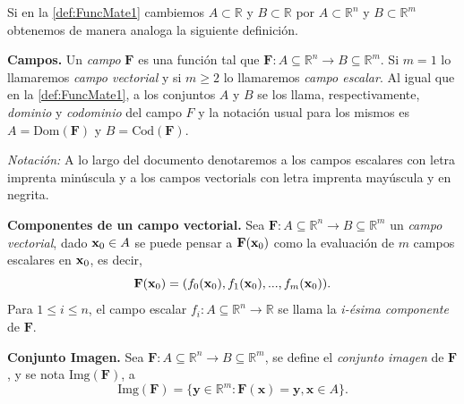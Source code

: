 
\begin{obs}
Si en la \autoref{def:FuncMate1} cambiemos  $A \subset \mathbb{R}$ y $B \subset \mathbb{R}$ por $A \subset \mathbb{R}^{n}$ y $B \subset \mathbb{R}^{m}$  obtenemos de manera analoga la siguiente definici\'on.    
\end{obs}
\begin{definition} {\textbf{Campos.}}
  Un \textit{campo} $\mathbf{F}$ es una funci\'on  tal que
    $\mathbf{F}:A\subseteq \mathbb{R}^n \rightarrow B \subseteq \mathbb{R}^m.$   Si $m=1$ lo llamaremos  \textit{ campo vectorial }  y  si  $m\geq 2$ lo llamaremos   \textit{ campo escalar}. Al igual que en la \autoref{def:FuncMate1}, a los conjuntos $A$ y $B$  se los llama, respectivamente, \textit{dominio}  y \textit{codominio} del campo $F$ y  la notaci\'on usual para los mismos  es  $A=\text{Dom}( \mathbf{F})$ y $B=\text{Cod}( \mathbf{F})$.   
  \end{definition}
  
  \textit{Notaci\'on:} A lo largo del documento denotaremos a los campos escalares con letra imprenta minúscula y a los campos vectorials con letra imprenta mayúscula y en negrita.
  
  \begin{definition} {\textbf{Componentes de un campo vectorial.}}
  Sea   $\mathbf{F}:A\subseteq \mathbb{R}^n \rightarrow B \subseteq \mathbb{R}^m$   un \textit{campo vectorial}, dado $\vect{x}_0 \in A$ se puede pensar a  $\mathbf{F}(\vect{x}_0)$   como la evaluación de $m$ campos escalares en $\vect{x}_0$, 
    es decir,
    \begin{equation*}
        \mathbf{F}(\vect{x}_0)=(f_0(\vect{x}_0), f_1(\vect{x}_0),..., f_m(\vect{x}_0)).
    \end{equation*}
  Para $1 \leq i \leq n$,  el campo escalar $f_i: A\subseteq \mathbb{R}^n \rightarrow  \mathbb{R}$ se llama la \textit{i-\'esima componente} de $\mathbf{F}.$
 \end{definition}
  
  
  \begin{definition}{\textbf{Conjunto Imagen.}}
    Sea  $\mathbf{F}:A\subseteq \mathbb{R}^n \rightarrow B \subseteq \mathbb{R}^m$, se define el \textit{conjunto imagen} de $\mathbf{F}$, y se nota $ \text{Img}(\mathbf{F})$, a 
    \begin{equation*}
        \text{Img}(\mathbf{F})=\{\mathbf{y}\in\mathbb{R}^m: \mathbf{F}(\mathbf{x})=\mathbf{y}, \mathbf{x} \in A\}.
    \end{equation*}
  \end{definition}
  
